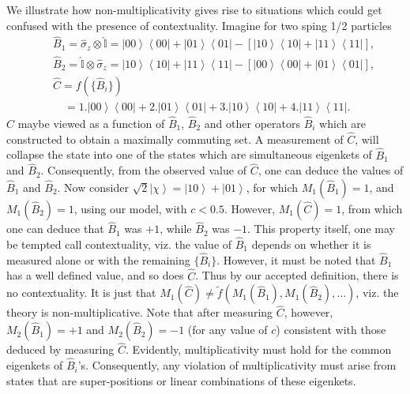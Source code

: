 \documentclass[british,aps,prl,superscriptaddress,nofootinbib,times,reprint]{revtex4-1}
\theoremstyle{plain}
\theoremstyle{plain}
\theoremstyle{definition}
\theoremstyle{remark}
\theoremstyle{remark}
\theoremstyle{remark}
\theoremstyle{plain}
\theoremstyle{plain}
\theoremstyle{plain}
\theoremstyle{definition}
\theoremstyle{definition}
\begin{document}
We illustrate how non-multiplicativity gives rise
to situations which could get confused with the
presence of contextuality.  Imagine for two sping
1/2 particles
\begin{eqnarray*}
&&\hat{B}_{1}\!=\!\hat{\sigma}_{z}\otimes\hat{\mathbb{I}}\!=\!
\left|00\right\rangle
\left\langle 00\right|+\left|01\right\rangle
\left\langle 01\right|-\left[\left|10\right\rangle
\left\langle 10\right|+\left|11\right\rangle
\left\langle 11\right|\right], \\
&&\hat{B}_{2}\!=\!\hat{\mathbb{I}}\otimes\hat{\sigma}_{z}\!=\!
\left|10\right\rangle
\left\langle 10\right|+\left|11\right\rangle
\left\langle 11\right|-\left[\left|00\right\rangle
\left\langle 00\right|+\left|01\right\rangle
\left\langle 01\right|\right], \\
&&\hat{C}=f(\{\hat{B}_{i}\}) \\
&&\quad=1.\left|00\right\rangle \left\langle
00\right|+2.\left|01\right\rangle \left\langle
01\right|+3.\left|10\right\rangle \left\langle
10\right|+4.\left|11\right\rangle \left\langle
11\right|. 
\end{eqnarray*}
$\hat{C}$ maybe viewed as a function of
$\hat{B}_{1}$, $\hat{B}_{2}$ and other operators
$\hat{B}_{i}$ which are constructed to obtain a
maximally commuting set. A measurement of
$\hat{C}$, will collapse the state into one of the
states which are simultaneous eigenkets of
$\hat{B}_{1}$ and $\hat{B}_{2}$. Consequently,
from the observed value of $\hat{C}$, one can
deduce the values of $\hat{B}_{1}$ and
$\hat{B}_{2}$. Now consider
$\sqrt{2}\left|\chi\right\rangle
=\left|10\right\rangle +\left|01\right\rangle $,
for which $M_{1}(\hat{B}_{1})=1$, and
$M_{1}(\hat{B}_{2})=1$, using our model, with
$c<0.5$. However, $M_{1}(\hat{C})=1$, from which
one can deduce that $\hat{B}_{1}$ was $+1$, while
$\hat{B}_{2}$ was $-1$.  This property itself, one
may be tempted call contextuality, viz.  the value
of $\hat{B}_{1}$ depends on whether it is measured
alone or with the remaining $\{\hat{B}_{i}\}$.
However, it must be noted that $\hat{B}_{1}$ has a
well defined value, and so does $\hat{C}$. Thus by
our accepted definition, there is no
contextuality. It is just that $M_{1}(\hat{C})\neq
\tilde
f(M_{1}(\hat{B}_{1}),M_{1}(\hat{B}_{2}),\dots)$,
viz. the theory is non-multiplicative. Note that
after measuring $\hat{C}$, however,
$M_{2}(\hat{B}_{1})=+1$ and
$M_{2}(\hat{B}_{2})=-1$ (for any value of $c$)
consistent with those deduced by measuring
$\hat{C}$.  Evidently, multiplicativity must hold
for the common eigenkets of $\hat{B}_{i}$'s.
Consequently, any violation of multiplicativity
must arise from states that are super-positions or
linear combinations of these eigenkets. 
\end{document}
